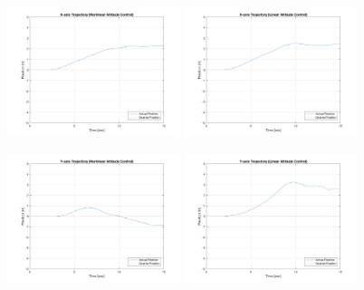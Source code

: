 \begin{figure}
    \centering
    \includegraphics[width=0.45\textwidth]{graphics/experiment_plots/altitude_non_position_x.png}
    \includegraphics[width=0.45\textwidth]{graphics/experiment_plots/altitude_pid_position_x.png}
    
    \includegraphics[width=0.45\textwidth]{graphics/experiment_plots/altitude_non_position_y.png}
    \includegraphics[width=0.45\textwidth]{graphics/experiment_plots/altitude_pid_position_y.png}
    

\end{figure}
